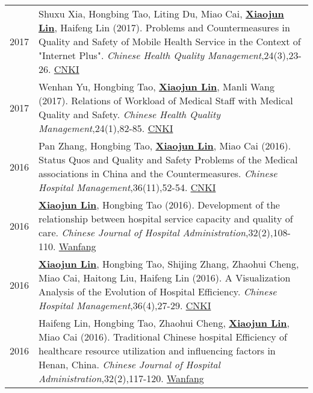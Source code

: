 \documentclass[a4paper,10pt]{article}
\begin{document}
\begin{longtable}{r p{13cm}}
2017 & Shuxu Xia, Hongbing Tao, Liting Du, Miao Cai, \underline{\textbf{Xiaojun Lin}}, Haifeng Lin (2017). Problems and Countermeasures in Quality and Safety of Mobile Health Service in the Context of "Internet Plus". \emph{Chinese Health Quality Management},24(3),23-26. \href{http://kns.cnki.net/KCMS/detail/detail.aspx?dbcode=CJFQ&dbname=CJFDLAST2017&filename=WSJG201703030&v=MjQwMTVHWklSOGVYMUx1eFlTN0RoMVQzcVRyV00xRnJDVVJMS2VadVp0RmlEbVViL01NajdCYWJHNEg5Yk1ySTk=}{CNKI}\\[5pt]

2017 & Wenhan Yu, Hongbing Tao, \underline{\textbf{Xiaojun Lin}}, Manli Wang (2017). Relations of Workload of Medical Staff with Medical Quality and Safety. \emph{Chinese Health Quality Management},24(1),82-85. \href{http://kns.cnki.net/KCMS/detail/detail.aspx?dbcode=CJFQ&dbname=CJFDLAST2017&filename=WSJG201701013&v=MDI5NThSOGVYMUx1eFlTN0RoMVQzcVRyV00xRnJDVVJMS2VadVp0RmlEbVY3M09NajdCYWJHNEg5Yk1ybzlFWjQ=}{CNKI}\\[5pt]

2016 & Pan Zhang, Hongbing Tao,  \underline{\textbf{Xiaojun Lin}}, Miao Cai (2016). Status Quos and Quality and Safety Problems of the Medical associations in China and the Countermeasures. \emph{Chinese Hospital Management},36(11),52-54. \href{http://kns.cnki.net/KCMS/detail/detail.aspx?dbcode=CJFQ&dbname=CJFDLAST2016&filename=YYGL201611027&v=MjM5Mjl1WnNGaXZtVTcvS1BEVE1Zckc0SDlmTnJvOUhZNFI4ZVgxTHV4WVM3RGgxVDNxVHJXTTFGckNVUkxLZVo=}{CNKI}\\[5pt]

2016 & \underline{\textbf{Xiaojun Lin}}, Hongbing Tao (2016). Development of the relationship between hospital service capacity and quality of care. \emph{Chinese Journal of Hospital Administration},32(2),108-110. \href{http://www.wanfangdata.com.cn/details/detail.do?_type=perio&id=zhyygl201602010}{Wanfang}\\[5pt]

2016 & \underline{\textbf{Xiaojun Lin}}, Hongbing Tao, Shijing Zhang, Zhaohui Cheng, Miao Cai, Haitong Liu, Haifeng Lin (2016). A Visualization Analysis of the Evolution of Hospital Efficiency. \emph{Chinese Hospital Management},36(4),27-29. \href{http://kns.cnki.net/KCMS/detail/detail.aspx?dbcode=CJFQ&dbname=CJFDLAST2016&filename=YYGL201604015&v=MjM5ODRSTEtlWnVadEZpRG5VNy9MUERUTVlyRzRIOWZNcTQ5RVlZUjhlWDFMdXhZUzdEaDFUM3FUcldNMUZyQ1U=}{CNKI}\\[5pt]

2016 & Haifeng Lin, Hongbing Tao, Zhaohui Cheng, \underline{\textbf{Xiaojun Lin}}, Miao Cai (2016). Traditional Chinese hospital Efficiency of healthcare resource utilization and influencing factors in Henan, China. \emph{Chinese Journal of Hospital Administration},32(2),117-120. \href{http://www.wanfangdata.com.cn/details/detail.do?_type=perio&id=zhyygl201602013}{Wanfang}\\[5pt]


\end{longtable}
\end{document}
